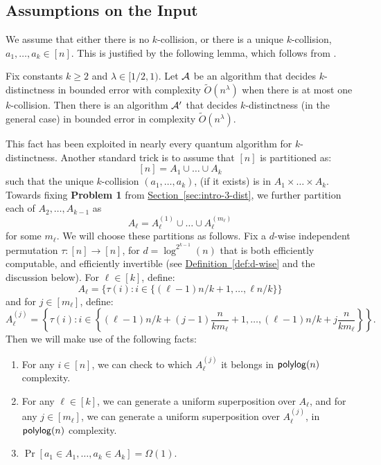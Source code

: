 \documentclass{article}
\renewcommand{\sec}[1]{\hyperref[sec:#1]{Section~\ref*{sec:#1}}}
\newcommand{\defin}[1]{\hyperref[def:#1]{Definition~\ref*{def:#1}}}
\renewcommand{\>}{\rangle}
\newcommand{\<}{\langle}
\renewcommand{\(}{\left(}
\renewcommand{\)}{\right)}
\begin{document}
\subsection{Assumptions on the Input}\label{sec:k-dist-assumptions}
We assume that either there is no $k$-collision, or there is a unique $k$-collision, $a_1,\dots,a_k\in [n]$. This is justified by the following lemma, which follows from \cite[Section 5]{ambainis2004QWalkForElementDist}.
\begin{lemma}\label{lem:unique-to-multiple}
	Fix constants $k\geq 2$ and $\lambda\in[1/2,1)$. 
	Let ${\cal A}$ be an algorithm that decides $k$-distinctness in bounded error with complexity $\widetilde{O}(n^{\lambda})$ when there is at most one $k$-collision. Then there is an algorithm ${\cal A}'$ that decides $k$-distinctness (in the general case) in bounded error in complexity $\widetilde{O}(n^{\lambda})$.
\end{lemma}
This fact has been exploited in nearly every quantum algorithm for $k$-distinctness.
Another standard trick is to assume that $[n]$ is partitioned as:
$$[n]=A_1\cup \dots \cup A_k$$
such that the unique $k$-collision $(a_1,\dots,a_k)$, (if it exists) is in $A_1\times\dots\times A_k$. Towards fixing \textbf{Problem 1} from \sec{intro-3-dist}, we further partition each of $A_2,\dots,A_{k-1}$ as 
$$A_{\ell}=A_{\ell}^{(1)}\cup\dots\cup A_{\ell}^{(m_{\ell})}$$
for some $m_{\ell}$. We will choose these partitions as follows. Fix a $d$-wise independent permutation $\tau:[n]\rightarrow [n]$, for $d=\log^{2^{k-1}}(n)$ that is both efficiently computable, and efficiently invertible (see \defin{d-wise} and the discussion below).
For ${\ell}\in [k]$, define:
$$A_{\ell}=\{\tau(i):i\in \{(\ell-1)n/k+1,\dots,\ell n/k\}\}$$
and for $j\in [m_\ell]$, define:
\begin{equation}\label{eq:k-dist-partition}
A_{\ell}^{(j)}=\left\{\tau(i): i\in \left\{(\ell-1)n/k+(j-1)\frac{n}{km_{\ell}}+1,\dots,(\ell-1)n/k+ j\frac{n}{km_\ell}\right\}\right\}.
\end{equation}
\noindent Then we will make use of the following facts:
\begin{lemma}
	\begin{enumerate}
		\item For any $i\in [n]$, we can check to which $A_{\ell}^{(j)}$ it belongs in ${\sf polylog}(n)$ complexity.
		\item For any $\ell\in [k]$, we can generate a uniform superposition over $A_\ell$, and for any $j\in [m_\ell]$, we can generate a uniform superposition over $A_\ell^{(j)}$, in ${\sf polylog}(n)$ complexity.
		\item $\Pr[a_1\in A_1,\dots,a_k\in A_k]=\Omega(1)$. 
	\end{enumerate}
\end{lemma}
\end{document}
